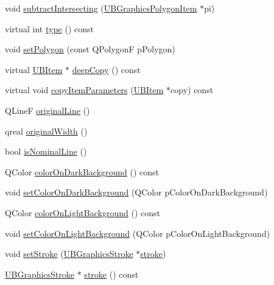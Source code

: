 \begin{DoxyCompactItemize}
\item 
void \hyperlink{class_u_b_graphics_polygon_item_ae42d7228ce873fe2d9c81dd5eac1c78b}{subtract\-Intersecting} (\hyperlink{class_u_b_graphics_polygon_item}{U\-B\-Graphics\-Polygon\-Item} $\ast$pi)
\item 
virtual int \hyperlink{class_u_b_graphics_polygon_item_a81d6518ecc9021e6f835ef7940ed6729}{type} () const 
\item 
void \hyperlink{class_u_b_graphics_polygon_item_afa6907c68bf122f751edf474bba9c99c}{set\-Polygon} (const Q\-Polygon\-F p\-Polygon)
\item 
virtual \hyperlink{class_u_b_item}{U\-B\-Item} $\ast$ \hyperlink{class_u_b_graphics_polygon_item_a71d5d1540d10dedaf6284e29216ce8c7}{deep\-Copy} () const 
\item 
virtual void \hyperlink{class_u_b_graphics_polygon_item_a4fc95b8ef165429d9f86ffe128e4839a}{copy\-Item\-Parameters} (\hyperlink{class_u_b_item}{U\-B\-Item} $\ast$copy) const 
\item 
Q\-Line\-F \hyperlink{class_u_b_graphics_polygon_item_ab349aaecd389a37904ceb2f28ae223da}{original\-Line} ()
\item 
qreal \hyperlink{class_u_b_graphics_polygon_item_aacda0659f1614f24634e4f7276ff1618}{original\-Width} ()
\item 
bool \hyperlink{class_u_b_graphics_polygon_item_a7132e5315a262757037e72e5fa379d5d}{is\-Nominal\-Line} ()
\item 
Q\-Color \hyperlink{class_u_b_graphics_polygon_item_a6526b10cc05fde764a2e11e233fe4318}{color\-On\-Dark\-Background} () const 
\item 
void \hyperlink{class_u_b_graphics_polygon_item_ac9933cb0cf460025e02b4c01482cd561}{set\-Color\-On\-Dark\-Background} (Q\-Color p\-Color\-On\-Dark\-Background)
\item 
Q\-Color \hyperlink{class_u_b_graphics_polygon_item_a8185c658dcb5920a98f14d4d18e8e060}{color\-On\-Light\-Background} () const 
\item 
void \hyperlink{class_u_b_graphics_polygon_item_aab20d0fba4216687b627ca7cd3eee90f}{set\-Color\-On\-Light\-Background} (Q\-Color p\-Color\-On\-Light\-Background)
\item 
void \hyperlink{class_u_b_graphics_polygon_item_a38329b96b64a7b9e68bbeefcf8e4b4e9}{set\-Stroke} (\hyperlink{class_u_b_graphics_stroke}{U\-B\-Graphics\-Stroke} $\ast$\hyperlink{class_u_b_graphics_polygon_item_a41dcbc4ac3e7682d6f8355c9fe6a5121}{stroke})
\item 
\hyperlink{class_u_b_graphics_stroke}{U\-B\-Graphics\-Stroke} $\ast$ \hyperlink{class_u_b_graphics_polygon_item_a41dcbc4ac3e7682d6f8355c9fe6a5121}{stroke} () const 
\end{DoxyCompactItemize}
